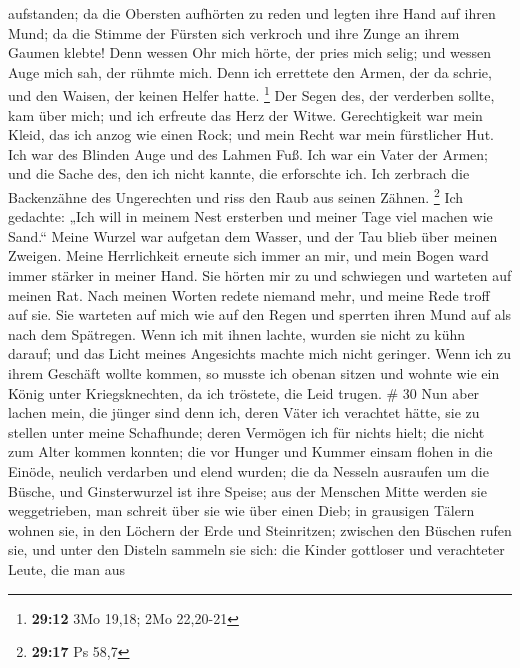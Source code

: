 aufstanden;  da die Obersten aufhörten zu reden und legten
ihre Hand auf ihren Mund;  da die Stimme der Fürsten sich
verkroch und ihre Zunge an ihrem Gaumen klebte!  Denn
wessen Ohr mich hörte, der pries mich selig; und wessen Auge mich sah,
der rühmte mich.  Denn ich errettete den Armen, der da
schrie, und den Waisen, der keinen Helfer hatte. \footnote{\textbf{29:12}
  3Mo 19,18; 2Mo 22,20-21}  Der Segen des, der verderben
sollte, kam über mich; und ich erfreute das Herz der Witwe.
 Gerechtigkeit war mein Kleid, das ich anzog wie einen
Rock; und mein Recht war mein fürstlicher Hut.  Ich war
des Blinden Auge und des Lahmen Fuß.  Ich war ein Vater
der Armen; und die Sache des, den ich nicht kannte, die erforschte ich.
 Ich zerbrach die Backenzähne des Ungerechten und riss
den Raub aus seinen Zähnen. \footnote{\textbf{29:17} Ps 58,7}
 Ich gedachte: „Ich will in meinem Nest ersterben und
meiner Tage viel machen wie Sand.``  Meine Wurzel war
aufgetan dem Wasser, und der Tau blieb über meinen Zweigen.
 Meine Herrlichkeit erneute sich immer an mir, und mein
Bogen ward immer stärker in meiner Hand.  Sie hörten mir
zu und schwiegen und warteten auf meinen Rat.  Nach
meinen Worten redete niemand mehr, und meine Rede troff auf sie.
 Sie warteten auf mich wie auf den Regen und sperrten
ihren Mund auf als nach dem Spätregen.  Wenn ich mit
ihnen lachte, wurden sie nicht zu kühn darauf; und das Licht meines
Angesichts machte mich nicht geringer.  Wenn ich zu ihrem
Geschäft wollte kommen, so musste ich obenan sitzen und wohnte wie ein
König unter Kriegsknechten, da ich tröstete, die Leid trugen. \# 30
 Nun aber lachen mein, die jünger sind denn ich, deren
Väter ich verachtet hätte, sie zu stellen unter meine Schafhunde;
 deren Vermögen ich für nichts hielt; die nicht zum Alter
kommen konnten;  die vor Hunger und Kummer einsam flohen
in die Einöde, neulich verdarben und elend wurden;  die da
Nesseln ausraufen um die Büsche, und Ginsterwurzel ist ihre Speise;
 aus der Menschen Mitte werden sie weggetrieben, man
schreit über sie wie über einen Dieb;  in grausigen Tälern
wohnen sie, in den Löchern der Erde und Steinritzen; 
zwischen den Büschen rufen sie, und unter den Disteln sammeln sie sich:
 die Kinder gottloser und verachteter Leute, die man aus
